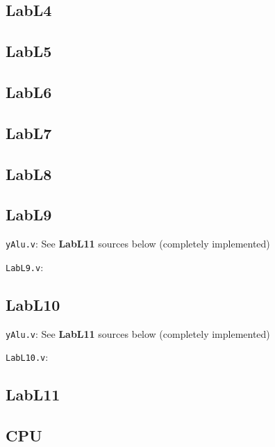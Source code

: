 \documentclass{article}
\begin{document}
\subsection{LabL4}



\subsection{LabL5}



\subsection{LabL6}



\subsection{LabL7}


\subsection{LabL8}



\subsection{LabL9}
\verb$yAlu.v$: See \textbf{LabL11} sources below (completely implemented)

\verb$LabL9.v$:


\subsection{LabL10}
\verb$yAlu.v$: See \textbf{LabL11} sources below (completely implemented)

\verb$LabL10.v$:


\subsection{LabL11}



\subsection{CPU}


\end{document}
